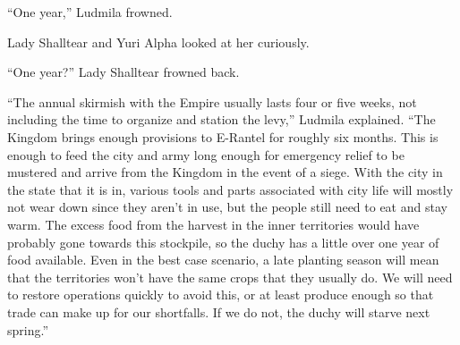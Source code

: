 “One year,” Ludmila frowned.

 

Lady Shalltear and Yuri Alpha looked at her curiously.

 

“One year?” Lady Shalltear frowned back.

 

“The annual skirmish with the Empire usually lasts four or five weeks, not including the time to organize and station the levy,” Ludmila explained. “The Kingdom brings enough provisions to E-Rantel for roughly six months. This is enough to feed the city and army long enough for emergency relief to be mustered and arrive from the Kingdom in the event of a siege. With the city in the state that it is in, various tools and parts associated with city life will mostly not wear down since they aren’t in use, but the people still need to eat and stay warm. The excess food from the harvest in the inner territories would have probably gone towards this stockpile, so the duchy has a little over one year of food available. Even in the best case scenario, a late planting season will mean that the territories won’t have the same crops that they usually do. We will need to restore operations quickly to avoid this, or at least produce enough so that trade can make up for our shortfalls. If we do not, the duchy will starve next spring.”